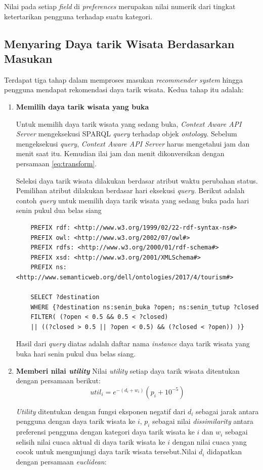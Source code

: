 Nilai pada setiap \textit{field} di \textit{preferences} merupakan nilai numerik dari tingkat ketertarikan pengguna terhadap suatu kategori.

\subsection{Menyaring Daya tarik Wisata Berdasarkan Masukan}
\par
Terdapat tiga tahap dalam memproses masukan \textit{recommender system} hingga pengguna mendapat rekomendasi daya tarik wisata. Kedua tahap itu adalah:
\begin{enumerate}
\item \textbf{Memilih daya tarik wisata yang buka}
\par
Untuk memilih daya tarik wisata yang sedang buka, \textit{Context Aware API Server} mengeksekusi SPARQL \textit{query} terhadap objek \textit{ontology}. Sebelum mengeksekusi
\textit{query}, \textit{Context Aware API Server} harus mengetahui jam dan menit saat itu. Kemudian ilai jam dan menit dikonversikan dengan persamaan \ref{eq:transform}.
\par
Seleksi daya tarik wisata dilakukan berdasar atribut waktu perubahan status. Pemilihan atribut dilakukan berdasar hari eksekusi \textit{query}. Berikut adalah contoh 
\textit{query} untuk memilih daya tarik wisata yang sedang buka pada hari senin pukul dua belas siang
\begin{verbatim}
	PREFIX rdf: <http://www.w3.org/1999/02/22-rdf-syntax-ns#>
	PREFIX owl: <http://www.w3.org/2002/07/owl#>
	PREFIX rdfs: <http://www.w3.org/2000/01/rdf-schema#>
	PREFIX xsd: <http://www.w3.org/2001/XMLSchema#>
	PREFIX ns: <http://www.semanticweb.org/dell/ontologies/2017/4/tourism#>
			
	SELECT ?destination 
	WHERE {?destination ns:senin_buka ?open; ns:senin_tutup ?closed 
	FILTER( (?open < 0.5 && 0.5 < ?closed)  
	|| ((?closed > 0.5 || ?open < 0.5) && (?closed < ?open)) )}
\end{verbatim}

Hasil dari \textit{query} diatas adalah daftar nama \textit{instance} daya tarik wisata yang buka hari senin pukul dua belas siang.
\item \textbf{Memberi nilai \textit{utility}}
Nilai \textit{utility} setiap daya tarik wisata ditentukan dengan persamaan berikut:
\begin{equation}
util_i = e^{-(d_i + w_i)} (p_i + 10^{-5})
\label{eq:utility} 
\end{equation}
\par
\textit{Utility} ditentukan dengan fungsi eksponen negatif dari $d_i$ sebagai jarak antara pengguna dengan daya tarik wisata ke $i$, $p_i$ sebagai nilai 
\textit{dissimilarity} antara preferensi pengguna dengan kategori daya tarik wisata ke $i$ dan $w_i$ sebagai selisih nilai cuaca aktual di daya tarik wisata ke $i$ dengan
nilai cuaca yang cocok untuk mengunjungi daya tarik wisata tersebut.Nilai $d_i$ didapatkan dengan persamaan \textit{euclidean}:


\end{enumerate}
